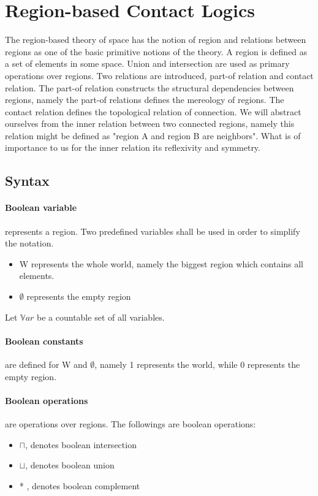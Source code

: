 \documentclass{article}
\begin{document}
	\section{Region-based Contact Logics}
The region-based theory of space has the notion of region and relations between regions as one of the basic primitive notions of the theory.
A region is defined as a set of elements in some space. Union and intersection are used as primary operations over regions.
Two relations are introduced, part-of relation and contact relation. 
The part-of relation constructs the structural dependencies between regions, namely the part-of relations defines the mereology of regions.
The contact relation defines the topological relation of connection. We will abstract ourselves from the inner relation between two connected regions, namely
this relation might be defined as "region A and region B are neighbors". What is of importance to us for the inner relation its reflexivity and symmetry.
	
	\subsection{Syntax}
	\paragraph{Boolean variable} 
represents a region. Two predefined variables shall be used in order to simplify the notation. 
		\begin{itemize}
			\item W represents the whole world, namely the biggest region which contains all elements.
			\item $\emptyset$ represents the empty region
		\end{itemize}
Let $\mathbb{V}ar$ be a countable set of all variables.

	\paragraph{Boolean constants}
are defined for W and $\emptyset$, namely 1 represents the world, while 0 represents the empty region.

	\paragraph{Boolean operations}
are operations over regions. The followings are boolean operations:
		\begin{itemize}
			\item $\sqcap$, denotes boolean intersection
			\item $\sqcup$, denotes boolean union
			\item * , denotes boolean complement
		\end{itemize}
\end{document}
